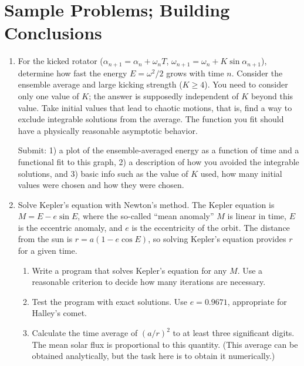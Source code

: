 \documentclass{article}
\begin{document}
\newpage
\section{Sample Problems; Building Conclusions}
\begin{enumerate}
\item \label{prbl:kicked}

For the kicked rotator ($\alpha_{n+1}=\alpha_n+\omega_n T$, $\omega_{n+1}=\omega_n + K\sin\alpha_{n+1}$), determine how fast the energy $E=\omega^2/2$ grows with time $n$.  
Consider the ensemble average and large kicking strength ($K \geq 4$). You need to consider only one value of $K$; the answer is supposedly independent of $K$ beyond this value.
Take initial values that lead to chaotic motions, that is, find a way to exclude integrable solutions from the average.
The function you fit should have a physically reasonable asymptotic behavior.


Submit:  1) a plot of the ensemble-averaged energy as a function of time and a functional fit to this graph, 
2) a description of how you avoided the integrable solutions, and 
3) basic info such as the value of $K$ used, how many initial values were chosen and how they were chosen. \\




\item\label{prbl:kepler}

Solve Kepler's equation with Newton's method.
The Kepler equation is $M=E-e\sin E$, where the so-called ``mean anomaly'' $M$ is linear in time, $E$ is the eccentric anomaly, and $e$ is the eccentricity of the orbit. The distance from the sun is $r = a(1-e\cos E)$, so solving Kepler's equation provides $r$ for a given time.
\begin{enumerate}
\item Write a program that solves Kepler's equation for any $M$.
Use a reasonable criterion to decide how many iterations are necessary.

\item Test the program with exact solutions.
Use $e=0.9671$, appropriate for Halley's comet.

\item Calculate the time average of $(a/r)^2$ to at least three significant digits. The mean solar flux is proportional to this quantity.
(This average can be obtained analytically, but the task here is to obtain it numerically.)\\
\end{enumerate}

\end{enumerate}
\end{document}
